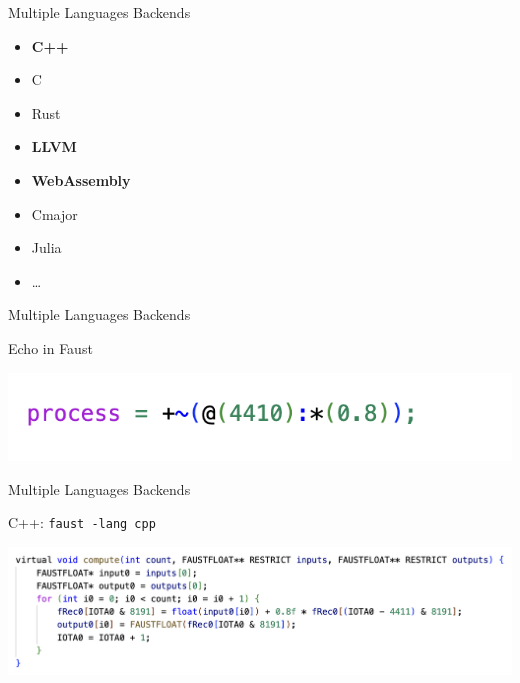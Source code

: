 
\begin{frame}[fragile]{Multiple Languages Backends}
    \begin{itemize}
        \item \textbf{C++}
        \item C
        \item Rust
        \item \textbf{LLVM}
        \item \textbf{WebAssembly}
        \item Cmajor
        \item Julia       
        \item \ldots
    \end{itemize}
\end{frame}


\begin{frame}[fragile]{Multiple Languages Backends}
    \begin{block}{Echo in Faust}
        \begin{center}
            \includegraphics[width=\textwidth,keepaspectratio=true]{images/echo-faust.png}
        \end{center}
    \end{block}
\end{frame}


\begin{frame}[fragile]{Multiple Languages Backends}

    \begin{block}{C++: \lstinline'faust -lang cpp'}
        \begin{center}
            \includegraphics[width=\textwidth,keepaspectratio=true]{images/echo-cpp.png}
        \end{center}
    \end{block}
\end{frame}


